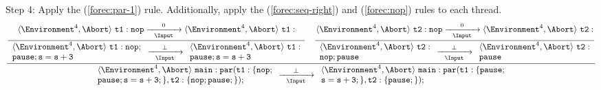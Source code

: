 \noindent
Step 4: Apply the (\ref{forec:par-1}) rule. Additionally, apply 
the (\ref{forec:seq-right}) and (\ref{forec:nop})
rules to each thread.
\begin{equation*}
	\frac{
		\dfrac{
				\langle \Environment^4, \Abort \rangle ~ \mathtt{t1: nop}
					\xrightarrow[~~\Input~~]{0} 
				\langle \Environment^4, \Abort \rangle ~ \mathtt{t1: }
			}{
				\begin{array}{l}
					\langle \Environment^4, \Abort \rangle ~ \mathtt{t1: nop;}	\\
					\mathtt{pause; s=s+3}										\\
				\end{array}
					\xrightarrow[~~\Input~~]{\bot} 
				\begin{array}{l}
					\langle \Environment^4, \Abort \rangle ~ \mathtt{t1: }		\\
					\mathtt{pause; s=s+3}										\\
				\end{array}
			}
			\quad
		\dfrac{
				\langle \Environment^4, \Abort \rangle ~ \mathtt{t2: nop}
					\xrightarrow[~~\Input~~]{0} 
				\langle \Environment^4, \Abort \rangle ~ \mathtt{t2: }
			}{
				\begin{array}{l}
					\langle \Environment^4, \Abort \rangle ~ \mathtt{t2: }	\\
					\mathtt{nop; pause}										\\
				\end{array}
					\xrightarrow[~~\Input~~]{\bot} 
				\begin{array}{l}
					\langle \Environment^4, \Abort \rangle ~ \mathtt{t2: }	\\
					\mathtt{pause}											\\
				\end{array}
			}
		}{
			\begin{array}{l}
				\langle \Environment^4, \Abort \rangle ~ \mathtt{main: par( t1:\{nop;}	\\
				\mathtt{pause; s=s+3;\}, t2:\{nop; pause;\} );}							\\
			\end{array}
				\xrightarrow[~~\Input~~]{\bot} 
			\begin{array}{l}
				\langle \Environment^4, \Abort \rangle ~ \mathtt{main: par( t1:\{pause;}\\
				\mathtt{s=s+3;\}, t2:\{pause;\} );}										\\
			\end{array}
		}
\end{equation*}

